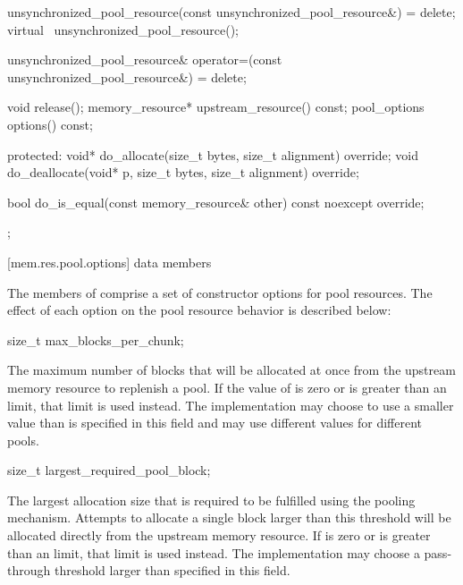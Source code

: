 \begin{codeblock}
{{    unsynchronized_pool_resource(const unsynchronized_pool_resource&) = delete;
    virtual ~unsynchronized_pool_resource();

    unsynchronized_pool_resource& operator=(const unsynchronized_pool_resource&) = delete;

    void release();
    memory_resource* upstream_resource() const;
    pool_options options() const;

  protected:
    void* do_allocate(size_t bytes, size_t alignment) override;
    void do_deallocate(void* p, size_t bytes, size_t alignment) override;

    bool do_is_equal(const memory_resource& other) const noexcept override;
  };
}
\end{codeblock}

[mem.res.pool.options]{ data members}

\pnum
The members of 
comprise a set of constructor options for pool resources.
The effect of each option on the pool resource behavior is described below:

%
\begin{itemdecl}
size_t max_blocks_per_chunk;
\end{itemdecl}

\begin{itemdescr}
\pnum
The maximum number of blocks that will be allocated at once
from the upstream memory resource
to replenish a pool.
If the value of  is zero or
is greater than an 
limit, that limit is used instead.
The implementation
may choose to use a smaller value than is specified in this field and
may use different values for different pools.
\end{itemdescr}

%
\begin{itemdecl}
size_t largest_required_pool_block;
\end{itemdecl}

\begin{itemdescr}
\pnum
The largest allocation size that is required to be fulfilled
using the pooling mechanism.
Attempts to allocate a single block larger than this threshold
will be allocated directly from the upstream memory resource.
If  is zero or
is greater than an 
limit, that limit is used instead.
The implementation may choose a pass-through threshold
larger than specified in this field.
\end{itemdescr}

